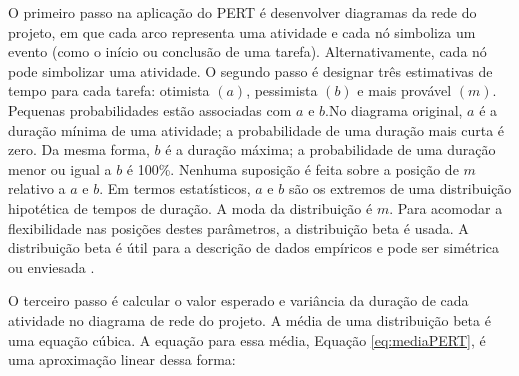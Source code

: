 O primeiro passo na aplicação do PERT é desenvolver diagramas da rede do projeto, em que cada arco representa uma atividade e cada nó simboliza um evento (como o início ou conclusão de uma tarefa). Alternativamente, cada nó pode simbolizar uma atividade. O segundo passo é designar três estimativas de tempo para cada tarefa: otimista $(a)$, pessimista $(b)$ e mais provável $(m)$. Pequenas probabilidades estão associadas com $a$ e $b$.No diagrama original, $a$ é a duração mínima de uma atividade; a probabilidade de uma duração mais curta é zero. Da mesma forma,  $b$ é a duração máxima; a probabilidade de uma duração menor ou igual a $b$ é 100\%. Nenhuma suposição é feita sobre a posição de $m$ relativo a $a$ e $b$. Em termos estatísticos,  $a$ e $b$ são os extremos de uma distribuição hipotética de tempos de duração. A moda da distribuição é $m$. Para acomodar a flexibilidade nas posições destes parâmetros, a distribuição beta é usada. A distribuição beta é útil para a descrição de dados empíricos e pode ser simétrica ou enviesada \cite{cottrell1999simplified}.

O terceiro passo é calcular o valor esperado e variância da duração de cada atividade no diagrama de rede do projeto. A média de uma distribuição beta é uma equação cúbica. A equação para essa média, Equação \ref{eq:mediaPERT}, é uma aproximação linear dessa forma:

